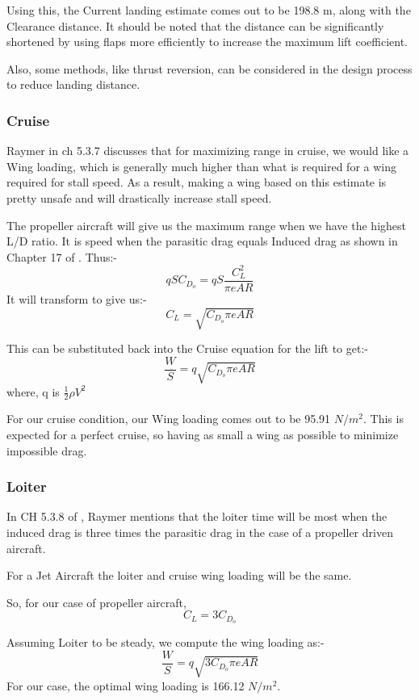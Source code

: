 \documentclass[12 pt]{article}
\begin{document}
Using this, the Current landing estimate comes out to be 198.8 m, along with the Clearance distance. It should be noted that the distance can be significantly shortened by using flaps more efficiently to increase the maximum lift coefficient.

Also, some methods, like thrust reversion, can be considered in the design process to reduce landing distance.


\subsubsection{{Cruise}}

Raymer in \cite{Raymer2006} ch 5.3.7 discusses that for maximizing range in cruise, we would like a Wing loading, which is generally much higher than what is required for a wing required for stall speed. As a result, making a wing based on this estimate is pretty unsafe and will drastically increase stall speed.

The propeller aircraft will give us the maximum range when we have the highest L/D ratio. It is speed when the parasitic drag equals Induced drag as shown in Chapter 17 of \cite{Raymer2006}. Thus:-
$$qSC_{D_o} = qS\frac{C_L^2}{\pi e AR}$$
It will transform to give us:- 
$$ C_L = \sqrt{C_{D_o} \pi e AR }$$

This can be substituted back into the Cruise equation for the lift to get:-
$$ \frac{W}{S} = q \sqrt{C_{D_o} \pi e AR}$$
where, q is $\frac{1}{2} \rho V^2 $

For our cruise condition, our Wing loading comes out to be 95.91 $N/m^2$. This is expected for a perfect cruise, so having as small a wing as possible to minimize impossible drag.

\subsubsection{{Loiter}}

In CH 5.3.8 of \cite{Raymer2006}, Raymer mentions that the loiter time will be most when the induced drag is three times the parasitic drag in the case of a propeller driven aircraft. 

For a Jet Aircraft the loiter and cruise wing loading will be the same. 

So, for our case of propeller aircraft, 
$$C_L = 3 C_{D_o}$$

Assuming Loiter to be steady, we compute the wing loading as:-
$$\frac{W}{S} = q \sqrt{3C_{D_o} \pi e AR}$$
For our case, the optimal wing loading is 166.12 $N/m^2$.
\end{document}
